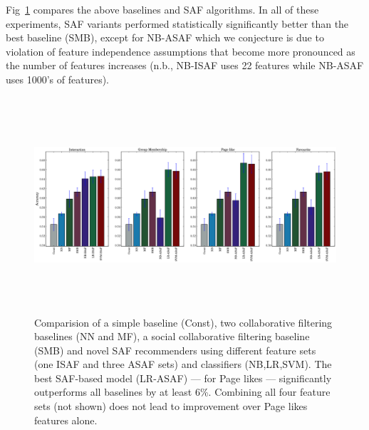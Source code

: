 Fig~\ref{Fig1} compares the above baselines and SAF algorithms.  In
all of these experiments, SAF variants performed statistically
significantly better than the best baseline (SMB), except for NB-ASAF
which we conjecture is due to violation of feature independence
assumptions that become more pronounced as the number of features
increases (n.b., NB-ISAF uses 22 features while NB-ASAF uses 1000's of
features).

\begin{figure}[tbh!]
\hspace{-6mm}\includegraphics[height=80mm,width=190mm]{data/newPlots/accuracy.eps}
\vspace{-6mm}
\caption{Comparision of a simple baseline (Const), two collaborative
  filtering baselines (NN and MF), a social collaborative filtering
  baseline (SMB) and novel SAF recommenders using different feature
  sets (one ISAF and three ASAF sets) and classifiers (NB,LR,SVM).
  The best SAF-based model (LR-ASAF) --- for Page likes --- significantly outperforms
  all baselines by at least 6\%.  Combining all four feature sets (not shown)
  does not lead to improvement over Page likes features alone.}
\label{Fig1}
\end{figure}

